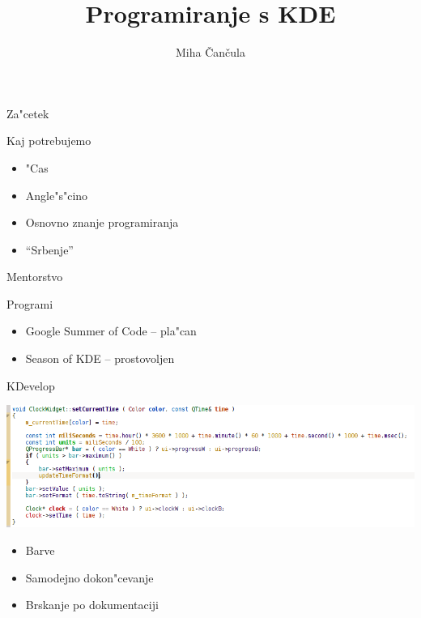 \documentclass{beamer}
\title{Programiranje s KDE}
\author{Miha \v Can\v cula}
\begin{document}
\frame{\titlepage}

\begin{frame}{Za"cetek}
  \begin{block}{Kaj potrebujemo}
    \begin{itemize}
      \item "Cas
      \item Angle"s"cino
      \item Osnovno znanje programiranja
      \item ``Srbenje''
    \end{itemize}
  \end{block}
\end{frame}

\begin{frame}{Mentorstvo}
\begin{block}{Programi}
\begin{itemize}
 \item Google Summer of Code -- pla"can
 \item Season of KDE -- prostovoljen
\end{itemize}
\end{block}
\end{frame}

\begin{frame}{KDevelop}

 \includegraphics[width=\textwidth]{./KDE/kdev-color}
  \begin{itemize}
   \item Barve
   \item Samodejno dokon"cevanje
   \item Brskanje po dokumentaciji
  \end{itemize}

\end{frame}
\end{document}
